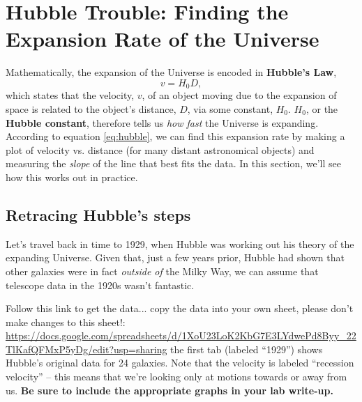 \documentclass[11pt]{article}
\begin{document}
\section{Hubble Trouble: Finding the Expansion Rate of the Universe}

Mathematically, the expansion of the Universe is encoded in \textbf{Hubble's Law},
\begin{equation} \label{eq:hubble}
    v = H_0 D,
\end{equation}
which states that the velocity, $v$, of an object moving due to the expansion of space is related to the object's distance, $D$, via some constant, $H_0$. $H_0$, or the \textbf{Hubble constant}, therefore tells us \emph{how fast} the Universe is expanding. According to equation \ref{eq:hubble}, we can find this expansion rate by making a plot of velocity vs. distance (for many distant astronomical objects) and measuring the \emph{slope} of the line that best fits the data. In this section, we'll see how this works out in practice.


\subsection{Retracing Hubble's steps}

Let's travel back in time to 1929, when Hubble was working out his theory of the expanding Universe. Given that, just a few years prior, Hubble had shown that other galaxies were in fact \emph{outside of} the Milky Way, we can assume that telescope data in the 1920s wasn't fantastic. 

\medskip \noindent
Follow this link to get the data... copy the data into your own sheet, please don't make changes to this sheet!: \url{https://docs.google.com/spreadsheets/d/1XoU23LoK2KbG7E3LYdwePd8Byy_22TlKafQFMxP5yDg/edit?usp=sharing} the first tab (labeled ``1929'') shows Hubble's original data for 24 galaxies. Note that the velocity is labeled ``recession velocity'' -- this means that we're looking only at motions towards or away from us.  \textbf{Be sure to include the appropriate graphs in your lab write-up.}
\end{document}
